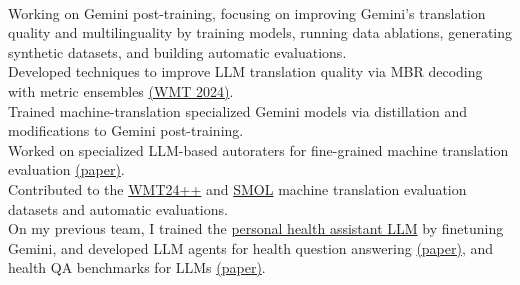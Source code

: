 
\\
Working on Gemini post-training, focusing on improving Gemini's translation quality and multilinguality by training models, running data ablations, generating synthetic datasets, and building automatic evaluations.\\
Developed techniques to improve LLM translation quality via MBR decoding with metric ensembles \href{https://aclanthology.org/2024.wmt-1.109.pdf}{(WMT 2024)}.\\
Trained machine-translation specialized Gemini models via distillation and modifications to Gemini post-training.\\
Worked on specialized LLM-based autoraters for fine-grained machine translation evaluation \href{https://arxiv.org/pdf/2411.15387}{(paper)}.\\
Contributed to the \href{https://arxiv.org/pdf/2502.12404}{WMT24++} and \href{https://arxiv.org/pdf/2502.12301}{SMOL} machine translation evaluation datasets and automatic evaluations.\\
On my previous team, I trained the \href{https://9to5google.com/2024/03/19/fitbit-labs-personal-health-llm/}{personal health assistant LLM} by finetuning Gemini, and developed LLM agents for health question answering \href{https://arxiv.org/pdf/2406.06464}{(paper)}, and health QA benchmarks for LLMs \href{https://arxiv.org/pdf/2305.15525}{(paper)}.\\

\vspace{-1mm}


